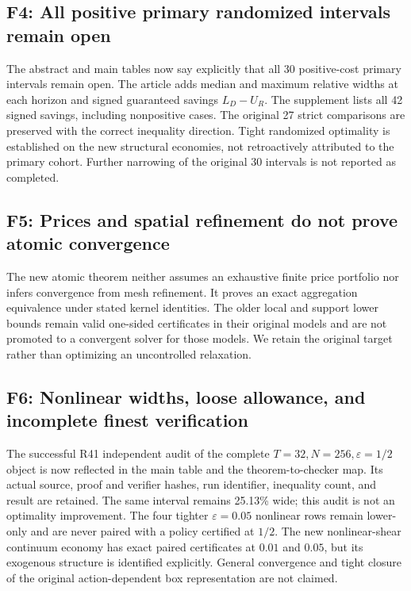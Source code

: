 \subsection*{F4: All positive primary randomized intervals remain open}
The abstract and main tables now say explicitly that all 30 positive-cost primary intervals remain open. The article adds median and maximum relative widths at each horizon and signed guaranteed savings $L_D-U_R$. The supplement lists all 42 signed savings, including nonpositive cases. The original 27 strict comparisons are preserved with the correct inequality direction. Tight randomized optimality is established on the new structural economies, not retroactively attributed to the primary cohort. Further narrowing of the original 30 intervals is not reported as completed.

\subsection*{F5: Prices and spatial refinement do not prove atomic convergence}
The new atomic theorem neither assumes an exhaustive finite price portfolio nor infers convergence from mesh refinement. It proves an exact aggregation equivalence under stated kernel identities. The older local and support lower bounds remain valid one-sided certificates in their original models and are not promoted to a convergent solver for those models. We retain the original target rather than optimizing an uncontrolled relaxation.

\subsection*{F6: Nonlinear widths, loose allowance, and incomplete finest verification}
The successful R41 independent audit of the complete $T=32,N=256,\varepsilon=1/2$ object is now reflected in the main table and the theorem-to-checker map. Its actual source, proof and verifier hashes, run identifier, inequality count, and result are retained. The same interval remains 25.13\% wide; this audit is not an optimality improvement. The four tighter $\varepsilon=0.05$ nonlinear rows remain lower-only and are never paired with a policy certified at $1/2$. The new nonlinear-shear continuum economy has exact paired certificates at $0.01$ and $0.05$, but its exogenous structure is identified explicitly. General convergence and tight closure of the original action-dependent box representation are not claimed.

